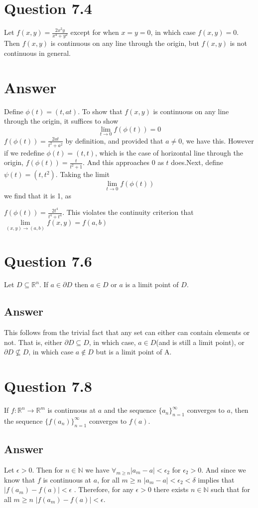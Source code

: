 \documentclass[
	12pt, %
]{fphw}
\begin{document}
\section*{Question 7.4}
\begin{problem}
	Let $f(x,y)=\frac{2x^2y}{x^4+y^2}$ except for when $x=y=0$, in which case $f(x,y)=0$. 
	Then $f(x,y)$ is continuous on any line through the origin, but $f(x,y)$ is not continuous in general. 
	
\end{problem}
\section*{Answer}
Define $\phi(t)=(t,at)$. To show that $f(x,y)$ is continuous on any line through the origin, it suffices to show 
$$\lim\limits_{t \to 0}f(\phi(t))=0$$
$f(\phi(t))=\frac{2at}{t^2+a^2}$ by definition, and provided that $a\neq 0$, we have this. However if we redefine $\phi(t)=(t,t)$, which is the case of horizontal line through the origin, 
$f(\phi(t))=\frac{t}{t^2+1}$. 
And this approaches $0$ as $t$ does.Next, define $\psi(t)=(t,t^2)$. Taking the limit $$\lim\limits_{t \to 0}f(\phi(t))$$ we find that it is 1, as 

$f(\phi(t))=\frac{2t^4}{t^4+t^4}$. This violates the continuity criterion that $\lim\limits_{(x,y) \to (a,b)}f(x,y)=f(a,b)$
\section*{Question 7.6}
\begin{problem}
	Let $D \subseteq \mathbb{R}^n$. If $a \in \partial D$ then $a \in D$ or $a$ is a limit point of $D$. 
\end{problem}
\subsection*{Answer}
This follows from the trivial fact that any set can either can contain elements or not. That is, either $\partial D \subseteq D$, in which case, $a \in D$(and is still a limit point), or $\partial D \not\subseteq D $, in which case $a\not\in D$ but is a limit point of A. 
\section*{Question 7.8}
\begin{problem}
	If $f:\mathbb{R}^n \to \mathbb{R}^m$ is continuous at $a$ and the sequence $\{a_n\}_{n=1}^{\infty}$ converges to $a$, then the sequence $\{f(a_n)\}_{n=1}^{\infty}$ converges to $f(a)$. 
\end{problem}
\subsection*{Answer}
Let $\epsilon>0$. Then for $n \in \mathbb{N}$ we have $\forall_{m\geq n} |a_m-a|<\epsilon_2$ for $\epsilon_2>0$. And since we know that $f$ is continuous at $a$, for all $m\geq n$ $|a_m-a|<\epsilon_2<\delta$ implies that $|f(a_m)-f(a)|<\epsilon$ . Therefore, for any $\epsilon>0$ there exists $n \in \mathbb{N}$ such that for all $m\geq n$ $|f(a_m)-f(a)|<\epsilon$.  
\end{document}
